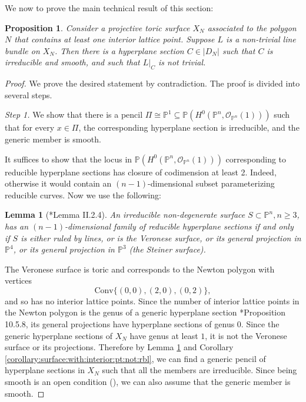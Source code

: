 \documentclass[11pt]{article} %
\newtheorem{lemma}[theorem]{Lemma}
\newtheorem{proposition}[theorem]{Proposition}
\theoremstyle{definition}
\newcommand{\marg}[1]{\normalsize{{\color{red}\footnote{{\color{blue}#1}}}{\marginpar[{\color{red}\hfill\tiny\thefootnote$\rightarrow$}]{{\color{red}$\leftarrow$\tiny\thefootnote}}}}}
\newcommand{\Gio}[1]{\marg{(Giovanni) #1}}
\begin{document}
We now to prove the main technical result of this section:
\begin{proposition}\label{prop:appendix}
Consider a projective toric surface $X_N$ associated to the polygon $N$ that contains at least one interior lattice point. Suppose  $L$ is a non-trivial line bundle on $X_N$. Then there is a hyperplane section $C \in |D_N|$ such that $C$ is irreducible and smooth, and such that $L|_C$ is not trivial.
\end{proposition}
\begin{proof}We prove the desired statement by contradiction.
The proof is divided into several steps.

\textit{Step 1.} We show that there is a pencil $\Pi\cong \mathbb{P}^1\subseteq \mathbb{P}(H^0(\mathbb{P}^n,\mathcal{O}_{\mathbb{P}^n}(1)))$ such that for every $x\in \Pi$, the corresponding hyperplane section is irreducible, and the generic member is smooth.

It suffices to show that the locus in $\mathbb{P}(H^0(\mathbb{P}^n,\mathcal{O}_{\mathbb{P}^n}(1)))$ corresponding to reducible hyperplane sections has closure of codimension at least 2. Indeed, otherwise it would contain an $(n-1)$-dimensional subset parameterizing reducible curves. %
Now we use the following:

\begin{lemma}[\cite{Lop91}*{Lemma II.2.4}]\label{lopez}
An irreducible non-degenerate surface $S \subset \mathbb P^n, n \geq 3$, has an $(n-1)$-dimensional family of reducible hyperplane sections if and only if $S$ is either ruled by lines, or is the Veronese surface, or its general projection in $\mathbb P^4$, or its general projection in $\mathbb P^3$ (the Steiner surface).
\end{lemma}
The Veronese surface is toric and  corresponds to the Newton polygon with vertices $$\text{Conv}\{(0,0), (2,0),(0,2)\},$$ and so has no interior lattice points. Since the number of interior lattice points in the Newton polygon is the genus of a generic hyperplane section \cite{CLS11}*{Proposition 10.5.8}, its general projections
have hyperplane sections of genus $0$. Since the generic hyperplane sections of $X_N$ have genus at least $1$, it is not the Veronese surface or its projections. Therefore by Lemma \ref{lopez} and Corollary \ref{corollary:surface:with:interior:pt:not:rbl}, we can find a generic pencil of hyperplane sections in $X_N$ such that all the members are irreducible. Since being smooth is an open condition (\cite[Theorem 12.2.4]{EGAIV}), we can also assume that the generic member is smooth.



\end{proof}
\end{document}
